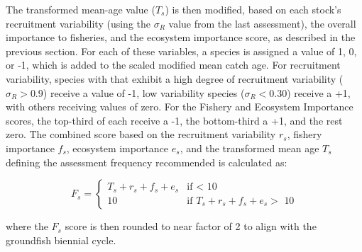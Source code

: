 \documentclass[11pt,
  english,
  a4paper,
]{article}
\begin{document}
The transformed mean-age value ({\(T_s\)\leavevmode\tagmcend\tagstructend}) is then modified, based on each stock's recruitment variability (using the {\(\sigma_R\)\leavevmode\tagmcend\tagstructend} value from the last assessment), the overall importance to fisheries, and the ecosystem importance score, as described in the previous section. For each of these variables, a species is assigned a value of 1, 0, or -1, which is added to the scaled modified mean catch age. For recruitment variability, species with that exhibit a high degree of recruitment variability ({\(\sigma_R > 0.9\)\leavevmode\tagmcend\tagstructend}) receive a value of -1, low variability species ({\(\sigma_R < 0.30\)\leavevmode\tagmcend\tagstructend}) receive a +1, with others receiving values of zero. For the Fishery and Ecosystem Importance scores, the top-third of each receive a -1, the bottom-third a +1, and the rest zero. The combined score based on the recruitment variability {\(r_s\)\leavevmode\tagmcend\tagstructend}, fishery importance {\(f_s\)\leavevmode\tagmcend\tagstructend}, ecosystem importance {\(e_s\)\leavevmode\tagmcend\tagstructend}, and the transformed mean age {\(T_s\)\leavevmode\tagmcend\tagstructend} defining the assessment frequency recommended is calculated as:

\leavevmode\tagmcend\tagstructend\par


{\[
F_s =
\begin{cases} 
T_s + r_s + f_s + e_s & \text{if $<$ 10}\\ 
10 & \text{if $T_s + r_s + f_s + e_s >$ 10} 
\end{cases}
\]\leavevmode\tagmcend\tagstructend}

\leavevmode\tagmcend\tagstructend\par


where the {\(F_s\)\leavevmode\tagmcend\tagstructend} score is then rounded to near factor of 2 to align with the groundfish biennial cycle.
\end{document}
